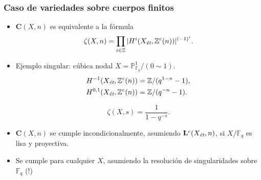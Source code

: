 \documentclass[handout]{beamer}
\newcommand{\FF}{\mathbb{F}}
\newcommand{\PP}{\mathbb{P}}
\newcommand{\ZZ}{\mathbb{Z}}
\newcommand{\et}{\text{\it ét}}
\begin{document}

\begin{frame}
  \frametitle{Caso de variedades sobre cuerpos finitos}

  \begin{itemize}
  \item $\mathbf{C} (X,n)$ es equivalente a la fórmula
    \[ \zeta (X,n) = \prod_{i \in \ZZ} |H^i (X_\et, \ZZ^c (n))|^{(-1)^i}. \]

  \item Ejemplo singular: cúbica nodal $X = \PP^1_{\FF_q} / (0\sim 1)$.
    \begin{align*}
      H^{-1} (X_\et, \ZZ^c (n)) & = \ZZ/(q^{1-n} - 1), \\
      H^{0,1} (X_\et, \ZZ^c (n)) & = \ZZ/(q^{-n} - 1).
    \end{align*}

    \[ \zeta (X,s) = \frac{1}{1 - q^{-s}}. \]

  \item $\mathbf{C} (X,n)$ se cumple incondicionalmente, asumiendo
    $\mathbf{L}^c (X_\et, n)$, si $X/\FF_q$ es lisa y proyectiva.

  \item Se cumple para cualquier $X$, asumiendo la resolución de singularidades
    sobre $\FF_q$ (!)
  \end{itemize}
\end{frame}

\end{document}
